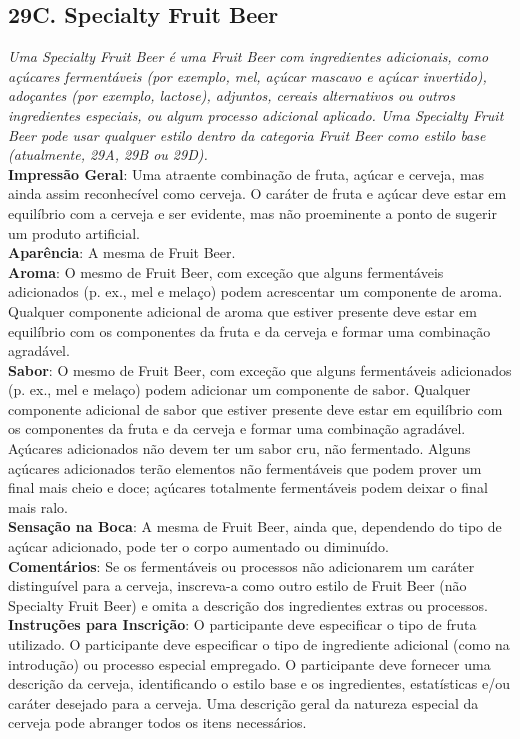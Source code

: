 \subsection*{29C. Specialty Fruit Beer}
\textit{Uma Specialty Fruit Beer é uma Fruit Beer com ingredientes adicionais, como açúcares fermentáveis (por exemplo, mel, açúcar mascavo e açúcar invertido), adoçantes (por exemplo, lactose), adjuntos, cereais alternativos ou outros ingredientes especiais, ou algum processo adicional aplicado. Uma Specialty Fruit Beer pode usar qualquer estilo dentro da categoria Fruit Beer como estilo base (atualmente, 29A, 29B ou 29D).}\\
\textbf{Impressão Geral}: Uma atraente combinação de fruta, açúcar e cerveja, mas ainda assim reconhecível como cerveja. O caráter de fruta e açúcar deve estar em equilíbrio com a cerveja e ser evidente, mas não proeminente a ponto de sugerir um produto artificial. \\
\textbf{Aparência}: A mesma de Fruit Beer. \\
\textbf{Aroma}: O mesmo de Fruit Beer, com exceção que alguns fermentáveis adicionados (p. ex., mel e melaço) podem acrescentar um componente de aroma. Qualquer componente adicional de aroma que estiver presente deve estar em equilíbrio com os componentes da fruta e da cerveja e formar uma combinação agradável. \\
\textbf{Sabor}: O mesmo de Fruit Beer, com exceção que alguns fermentáveis adicionados (p. ex., mel e melaço) podem adicionar um componente de sabor. Qualquer componente adicional de sabor que estiver presente deve estar em equilíbrio com os componentes da fruta e da cerveja e formar uma combinação agradável. Açúcares adicionados não devem ter um sabor cru, não fermentado. Alguns açúcares adicionados terão elementos não fermentáveis que podem prover um final mais cheio e doce; açúcares totalmente fermentáveis podem deixar o final mais ralo. \\
\textbf{Sensação na Boca}: A mesma de Fruit Beer, ainda que, dependendo do tipo de açúcar adicionado, pode ter o corpo aumentado ou diminuído. \\
\textbf{Comentários}: Se os fermentáveis ou processos não adicionarem um caráter distinguível para a cerveja, inscreva-a como outro estilo de Fruit Beer (não Specialty Fruit Beer) e omita a descrição dos ingredientes extras ou processos. \\
\textbf{Instruções para Inscrição}: O participante deve especificar o tipo de fruta utilizado. O participante deve especificar o tipo de ingrediente adicional (como na introdução) ou processo especial empregado. O participante deve fornecer uma descrição da cerveja, identificando o estilo base e os ingredientes, estatísticas e/ou caráter desejado para a cerveja. Uma descrição geral da natureza especial da cerveja pode abranger todos os itens necessários. \\
